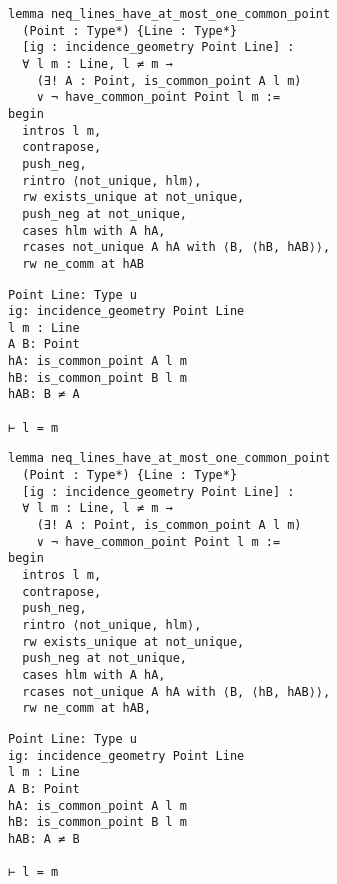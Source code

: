 \begin{frame}[fragile]
	\begin{multicols}{2}
		\begin{lstlisting}
lemma neq_lines_have_at_most_one_common_point 
  (Point : Type*) {Line : Type*} 
  [ig : incidence_geometry Point Line] :
  ∀ l m : Line, l ≠ m → 
    (∃! A : Point, is_common_point A l m) 
    ∨ ¬ have_common_point Point l m := 
begin
  intros l m,
  contrapose,
  push_neg,
  rintro ⟨not_unique, hlm⟩,
  rw exists_unique at not_unique,
  push_neg at not_unique,
  cases hlm with A hA,
  rcases not_unique A hA with ⟨B, ⟨hB, hAB⟩⟩,
  rw ne_comm at hAB
\end{lstlisting}
		\columnbreak
		\begin{lstlisting}
Point Line: Type u
ig: incidence_geometry Point Line
l m : Line
A B: Point
hA: is_common_point A l m
hB: is_common_point B l m
hAB: B ≠ A

⊢ l = m
\end{lstlisting}
	\end{multicols}
\end{frame}










\begin{frame}[fragile]
	\begin{multicols}{2}
		\begin{lstlisting}
lemma neq_lines_have_at_most_one_common_point 
  (Point : Type*) {Line : Type*} 
  [ig : incidence_geometry Point Line] :
  ∀ l m : Line, l ≠ m → 
    (∃! A : Point, is_common_point A l m) 
    ∨ ¬ have_common_point Point l m := 
begin
  intros l m,
  contrapose,
  push_neg,
  rintro ⟨not_unique, hlm⟩,
  rw exists_unique at not_unique,
  push_neg at not_unique,
  cases hlm with A hA,
  rcases not_unique A hA with ⟨B, ⟨hB, hAB⟩⟩,
  rw ne_comm at hAB,
\end{lstlisting}
		\columnbreak
		\begin{lstlisting}
Point Line: Type u
ig: incidence_geometry Point Line
l m : Line
A B: Point
hA: is_common_point A l m
hB: is_common_point B l m
hAB: A ≠ B

⊢ l = m
\end{lstlisting}
	\end{multicols}
\end{frame}










